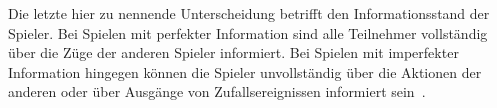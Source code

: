 Die letzte hier zu nennende Unterscheidung betrifft den Informationsstand der Spieler. 
Bei Spielen mit perfekter Information sind alle Teilnehmer vollständig über die Züge der anderen Spieler informiert. 
Bei Spielen mit imperfekter Information hingegen können die Spieler unvollständig über die Aktionen der anderen oder über Ausgänge von Zufallsereignissen informiert sein~\cite[Kap.~1.2]{osborne1994course}.

